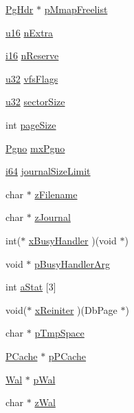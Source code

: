 \begin{DoxyCompactItemize}
\item 
\hyperlink{struct_pg_hdr}{Pg\+Hdr} $\ast$ \hyperlink{struct_pager_ae13253447db00c0cb1613cf60f77afc3}{p\+Mmap\+Freelist}
\item 
\hyperlink{sqlite3_8c_a20f2299e322dcbde37cb07b16910b843}{u16} \hyperlink{struct_pager_a20cc0a06d1046c9dd0aa2001c5c2b4f7}{n\+Extra}
\item 
\hyperlink{sqlite3_8c_a7b32340f65cd15f029caad258fb3355c}{i16} \hyperlink{struct_pager_aaf8a4d8a8f4618f4299ef0bb4b8b3ed2}{n\+Reserve}
\item 
\hyperlink{sqlite3_8c_a03ad5adfaeb9b7640dde78a0cc390319}{u32} \hyperlink{struct_pager_a8549852e04ca6a05bf6c18e1e8148ccb}{vfs\+Flags}
\item 
\hyperlink{sqlite3_8c_a03ad5adfaeb9b7640dde78a0cc390319}{u32} \hyperlink{struct_pager_af16a57f273bd3839ee95354c4a39262e}{sector\+Size}
\item 
int \hyperlink{struct_pager_a0f8fcbb2d8136c7d33c2e72f3642d6f2}{page\+Size}
\item 
\hyperlink{sqlite3_8c_aec0c653e8dd16e4639caf2f8ea54f55c}{Pgno} \hyperlink{struct_pager_a4296f399610c7c39ee6187340ea5666d}{mx\+Pgno}
\item 
\hyperlink{sqlite3_8c_a2a0f0f4ae7001eb54351f77ea1cdbcfd}{i64} \hyperlink{struct_pager_aada024f938738bdded1f7d066086dced}{journal\+Size\+Limit}
\item 
char $\ast$ \hyperlink{struct_pager_a47b2dee2615c9bcdc2d8b755dc571e35}{z\+Filename}
\item 
char $\ast$ \hyperlink{struct_pager_ac131f027b6287ec5068c33fd866e5dbd}{z\+Journal}
\item 
int($\ast$ \hyperlink{struct_pager_a3c0ec4b23e5e61ba3ee7ae2021ed6128}{x\+Busy\+Handler} )(void $\ast$)
\item 
void $\ast$ \hyperlink{struct_pager_a9000362142a6d1a15587cdd9534c2213}{p\+Busy\+Handler\+Arg}
\item 
int \hyperlink{struct_pager_ad00d3a845ed5e63880bb144b35ccb053}{a\+Stat} \mbox{[}3\mbox{]}
\item 
void($\ast$ \hyperlink{struct_pager_a1024b74014114a0ccd65cbeb57bf9137}{x\+Reiniter} )(Db\+Page $\ast$)
\item 
char $\ast$ \hyperlink{struct_pager_a440071186989fd8259c13a1f1439df19}{p\+Tmp\+Space}
\item 
\hyperlink{struct_p_cache}{P\+Cache} $\ast$ \hyperlink{struct_pager_af7a3a5c5ac8350d706a68a66e5675f2d}{p\+P\+Cache}
\item 
\hyperlink{struct_wal}{Wal} $\ast$ \hyperlink{struct_pager_ac5f3cfd978474a39e7462844ec1a6fe1}{p\+Wal}
\item 
char $\ast$ \hyperlink{struct_pager_a383f1a3f6524788fe82a0f19e97fbb01}{z\+Wal}
\end{DoxyCompactItemize}


